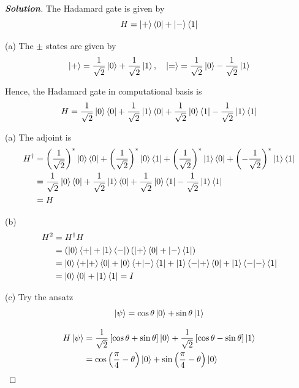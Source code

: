 \documentclass[a4paper,11pt]{article}
\newenvironment{solution}[1]
  {\renewcommand\qedsymbol{$\square$}\begin{proof}[\textbf{Solution#1}]}
  {\end{proof}}
\begin{document}
\begin{solution}{}
    The Hadamard gate is given by
    \begin{equation}
        H = \ket{+}\bra{0}+\ket{-}\bra{1}
    \end{equation}
    
    (a)
    The $\pm$ states are given by
    \begin{equation}
        \ket{+} = \frac{1}{\sqrt2}\ket{0} + \frac{1}{\sqrt2}\ket{1}, \quad
        \ket{=} = \frac{1}{\sqrt2}\ket{0} - \frac{1}{\sqrt2}\ket{1}
    \end{equation}
    
    Hence, the Hadamard gate in computational basis is
    \begin{equation}
        H=\frac{1}{\sqrt2}\ket{0}\bra{0} + \frac{1}{\sqrt2}\ket{1}\bra{0} + \frac{1}{\sqrt2}\ket{0}\bra{1} - \frac{1}{\sqrt2}\ket{1}\bra{1}
    \end{equation}
    
    (a) The adjoint is
    \begin{align}
        H^\dagger&=\left(\frac{1}{\sqrt2}\right)^*\ket{0}\bra{0} + \left(\frac{1}{\sqrt2}\right)^*\ket{0}\bra{1} + \left(\frac{1}{\sqrt2}\right)^*\ket{1}\bra{0} + \left(-\frac{1}{\sqrt2}\right)^*\ket{1}\bra{1} \\
        &=\frac{1}{\sqrt2}\ket{0}\bra{0} + \frac{1}{\sqrt2}\ket{1}\bra{0} + \frac{1}{\sqrt2}\ket{0}\bra{1} - \frac{1}{\sqrt2}\ket{1}\bra{1} \\
        &=H
    \end{align}

    (b)
    \begin{align}
        H^2&=H^\dagger H\\
        &=\left(\ket{0}\bra{+}+\ket{1}\bra{-}\right)\left(\ket{+}\bra{0}+\ket{-}\bra{1}\right)\\
        &=\ket{0}\braket{+|+}\bra{0} + \ket{0}\braket{+|-}\bra{1} + \ket{1}\braket{-|+}\bra{0} + \ket{1}\braket{-|-}\bra{1}\\
        &=\ket{0}\bra{0} + \ket{1}\bra{1} = I
    \end{align}

    (c) Try the ansatz
    \begin{equation}
        \ket{\psi} = \cos\theta\ket{0} + \sin\theta\ket{1}
    \end{equation}

    \begin{align}
        H\ket\psi &= \frac{1}{\sqrt2}\left[\cos\theta + \sin\theta\right]\ket{0} + \frac{1}{\sqrt2}\left[\cos\theta - \sin\theta\right]\ket{1} \\
        &= \cos\left(\frac{\pi}{4} - \theta\right)\ket{0} + \sin\left(\frac{\pi}{4} - \theta\right)\ket{0}
    \end{align}


\end{solution}
\end{document}
